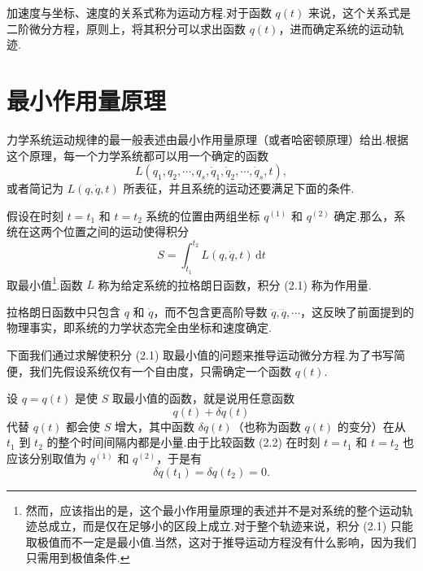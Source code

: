 加速度与坐标、速度的关系式称为运动方程.对于函数 $q(t)$ 来说，这个关系式是二阶微分方程，原则上，将其积分可以求出函数 $q(t)$，进而确定系统的运动轨迹.

\section{最小作用量原理}

力学系统运动规律的最一般表述由最小作用量原理（或者哈密顿原理）给出.根据这个原理，每一个力学系统都可以用一个确定的函数
\begin{equation*}
  L(q_1,q_2,\cdots,q_s,\dot{q}_1,\dot{q}_2,\cdots,\dot{q}_s,t),
\end{equation*}
或者简记为 $L(q,\dot{q},t)$ 所表征，并且系统的运动还要满足下面的条件.

假设在时刻 $t=t_1$ 和 $t=t_2$ 系统的位置由两组坐标 $q^{(1)}$ 和 $q^{(2)}$ 确定.那么，系统在这两个位置之间的运动使得积分
\begin{equation}
  S=\int_{t_1}^{t_2} L(q,\dot{q},t)\,\mathrm{d}t
\end{equation}
取最小值\footnote{然而，应该指出的是，这个最小作用量原理的表述并不是对系统的整个运动轨迹总成立，而是仅在足够小的区段上成立.对于整个轨迹来说，积分 (2.1) 只能取极值而不一定是最小值.当然，这对于推导运动方程没有什么影响，因为我们只需用到极值条件.}.函数 $L$ 称为给定系统的拉格朗日函数，积分 (2.1) 称为作用量.

拉格朗日函数中只包含 $q$ 和 $\dot{q}$，而不包含更高阶导数 $\ddot{q},\dddot{q},\cdots$，这反映了前面提到的物理事实，即系统的力学状态完全由坐标和速度确定.

下面我们通过求解使积分 (2.1) 取最小值的问题来推导运动微分方程.为了书写简便，我们先假设系统仅有一个自由度，只需确定一个函数 $q(t)$.

设 $q=q(t)$ 是使 $S$ 取最小值的函数，就是说用任意函数
\begin{equation}
  q(t)+\delta q(t)
\end{equation}
代替 $q(t)$ 都会使 $S$ 增大，其中函数 $\delta q(t)$（也称为函数 $q(t)$ 的变分）在从 $t_1$ 到 $t_2$ 的整个时间间隔内都是小量.由于比较函数 (2.2) 在时刻 $t=t_1$ 和 $t=t_2$ 也应该分别取值为 $q^{(1)}$ 和 $q^{(2)}$，于是有
\begin{equation}
  \delta q(t_1)=\delta q(t_2)=0.
\end{equation}

